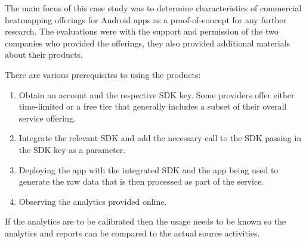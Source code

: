 The main focus of this case study was to determine characteristics of commercial heatmapping offerings for Android apps as a proof-of-concept for any further research. The evaluations were with the support and permission of the two companies who provided the offerings, they also provided additional materials about their products. 

There are various prerequisites to using the products:
\begin{enumerate}
    \item Obtain an account and the respective SDK key. Some providers offer either time-limited or a free tier that generally includes a subset of their overall service offering. 
    \item Integrate the relevant SDK and add the necessary call to the SDK passing in the SDK key as a parameter.
    \item Deploying the app with the integrated SDK and the app being used to generate the raw data that is then processed as part of the service.
    \item Observing the analytics provided online.
\end{enumerate}

If the analytics are to be calibrated then the usage needs to be known so the analytics and reports can be compared to the actual source activities.



